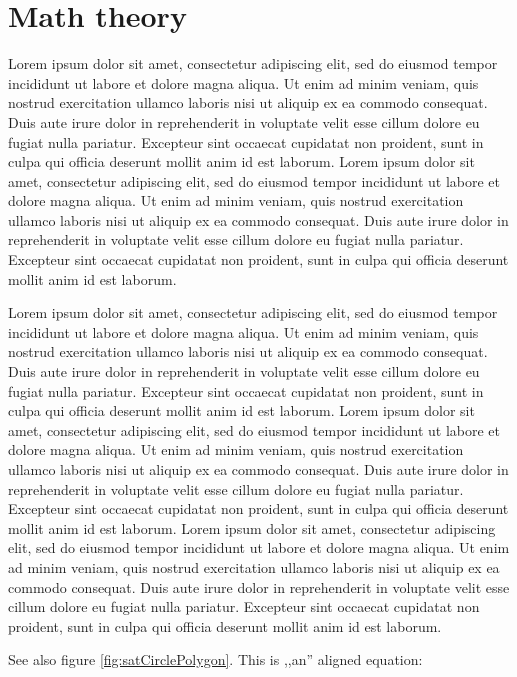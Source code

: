 \section{Math theory} \label{02_math_theory}

Lorem ipsum dolor sit amet, consectetur adipiscing elit, sed do eiusmod tempor incididunt ut labore et dolore magna aliqua. Ut enim ad minim veniam, quis nostrud exercitation ullamco laboris nisi ut aliquip ex ea commodo consequat. Duis aute irure dolor in reprehenderit in voluptate velit esse cillum dolore eu fugiat nulla pariatur. Excepteur sint occaecat cupidatat non proident, sunt in culpa qui officia deserunt mollit anim id est laborum.
Lorem ipsum dolor sit amet, consectetur adipiscing elit, sed do eiusmod tempor incididunt ut labore et dolore magna aliqua. Ut enim ad minim veniam, quis nostrud exercitation ullamco laboris nisi ut aliquip ex ea commodo consequat. Duis aute irure dolor in reprehenderit in voluptate velit esse cillum dolore eu fugiat nulla pariatur. Excepteur sint occaecat cupidatat non proident, sunt in culpa qui officia deserunt mollit anim id est laborum.

Lorem ipsum dolor sit amet, consectetur adipiscing elit, sed do eiusmod tempor incididunt ut labore et dolore magna aliqua. Ut enim ad minim veniam, quis nostrud exercitation ullamco laboris nisi ut aliquip ex ea commodo consequat. Duis aute irure dolor in reprehenderit in voluptate velit esse cillum dolore eu fugiat nulla pariatur. Excepteur sint occaecat cupidatat non proident, sunt in culpa qui officia deserunt mollit anim id est laborum.
Lorem ipsum dolor sit amet, consectetur adipiscing elit, sed do eiusmod tempor incididunt ut labore et dolore magna aliqua. Ut enim ad minim veniam, quis nostrud exercitation ullamco laboris nisi ut aliquip ex ea commodo consequat. Duis aute irure dolor in reprehenderit in voluptate velit esse cillum dolore eu fugiat nulla pariatur. Excepteur sint occaecat cupidatat non proident, sunt in culpa qui officia deserunt mollit anim id est laborum.
Lorem ipsum dolor sit amet, consectetur adipiscing elit, sed do eiusmod tempor incididunt ut labore et dolore magna aliqua. Ut enim ad minim veniam, quis nostrud exercitation ullamco laboris nisi ut aliquip ex ea commodo consequat. Duis aute irure dolor in reprehenderit in voluptate velit esse cillum dolore eu fugiat nulla pariatur. Excepteur sint occaecat cupidatat non proident, sunt in culpa qui officia deserunt mollit anim id est laborum.

See also figure \ref{fig:satCirclePolygon}.
This is ,,an'' aligned equation:

